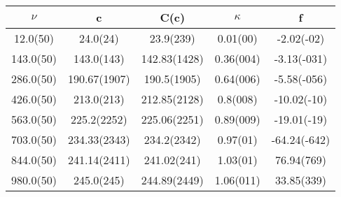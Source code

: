 \begin{table}[H]
	\centering
	\begin{tabular}{ccccc}
		$\nu$ & c & C(c) & $\kappa$ & f\\
		\hline
		12.0(50) & 24.0(24) & 23.9(239) & 0.01(00) & -2.02(-02)	\\
		143.0(50) & 143.0(143) & 142.83(1428) & 0.36(004) & -3.13(-031)	\\
		286.0(50) & 190.67(1907) & 190.5(1905) & 0.64(006) & -5.58(-056)	\\
		426.0(50) & 213.0(213) & 212.85(2128) & 0.8(008) & -10.02(-10)	\\
		563.0(50) & 225.2(2252) & 225.06(2251) & 0.89(009) & -19.01(-19)	\\
		703.0(50) & 234.33(2343) & 234.2(2342) & 0.97(01) & -64.24(-642)	\\
		844.0(50) & 241.14(2411) & 241.02(241) & 1.03(01) & 76.94(769)	\\
		980.0(50) & 245.0(245) & 244.89(2449) & 1.06(011) & 33.85(339)	\\
	\end{tabular}
\end{table}
